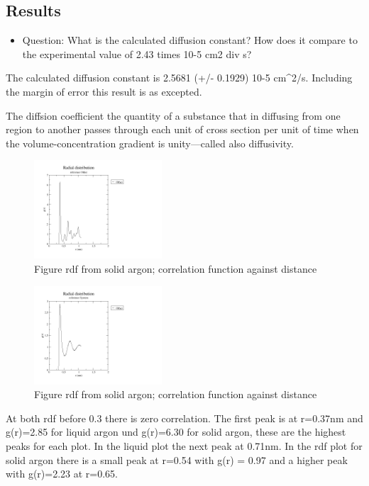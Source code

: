 \subsection{Results}

\begin{itemize}
    \item Question: What is the calculated diffusion constant? How does it compare to the experimental value of 2.43 times 10-5 cm2 div s?
\end{itemize}

The calculated diffusion constant is 2.5681 (+/- 0.1929) 10-5 cm^2/s. Including the margin of error this result is as excepted. 

The diffsion coefficient the quantity of a substance that in diffusing from one region to another passes through each unit of cross section per unit of time when the volume-concentration gradient is unity—called also diffusivity.       
        

\begin{figure}[t]
    \centering
    \includegraphics[width=180px]{plots/rdf_solid.png}
    \caption{Figure rdf from solid argon; correlation function against distance}
    \label{rdf solid}
\end{figure}

\begin{figure}[t]
    \centering
    \includegraphics[width=180px]{plots/rdf_liquid.png}
    \caption{Figure rdf from solid argon; correlation function against distance}
    \label{rdf liquid}
\end{figure}

At both rdf before 0.3 there is zero correlation. The first peak is at r=0.37nm and g(r)=2.85 for liquid argon und g(r)=6.30 for solid argon, these are the highest peaks for each plot. In the liquid plot the next peak at 0.71nm. In the rdf plot for solid argon there is a small peak at r=0.54 with g(r) = 0.97 and a higher peak with g(r)=2.23 at r=0.65.

